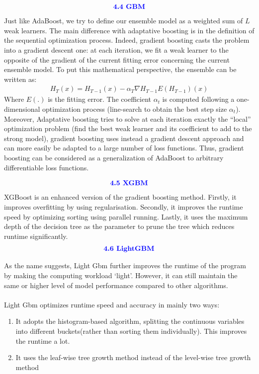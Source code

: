 \documentclass{homework}
\begin{document}
\begin{align*}
    \textcolor{blue}{ \text{{\textbf{4.4 GBM}}}}
 \end{align*}
 Just like AdaBoost, we try to define our ensemble model as a weighted sum of $L$ weak learners. The main difference with adaptative boosting is in the definition of the sequential optimization process. Indeed, gradient boosting casts the problem into a gradient descent one: at each iteration, we fit a weak learner to the opposite of the gradient of the current fitting error concerning the current ensemble model. To put this mathematical perspective, the ensemble can be written as:
 \begin{align*}
    H_T(x) = H_{T-1}(x) - \alpha_T \nabla{H_{T-1}} E(H_{T-1})(x)
 \end{align*}
 Where $E(.)$ is the fitting error. 
 The coefficient $\alpha_t$ is computed following a one-dimensional optimization process (line-search to obtain the best step size $\alpha_t$). Moreover, Adaptative boosting tries to solve at each iteration exactly the “local” optimization problem (find the best weak learner and its coefficient to add to the strong model), gradient boosting uses instead a gradient descent approach and can more easily be adapted to a large number of loss functions. Thus, gradient boosting can be considered as a generalization of AdaBoost to arbitrary differentiable loss functions.

 \begin{align*}
    \textcolor{blue}{ \text{{\textbf{4.5 XGBM}}}}
 \end{align*}
 XGBoost is an enhanced version of the gradient boosting method. Firstly, it improves overfitting by using regularisation. Secondly, it improves the runtime speed by optimizing sorting using parallel running. Lastly, it uses the maximum depth of the decision tree as the parameter to prune the tree which reduces runtime significantly.
 \begin{align*}
    \textcolor{blue}{ \text{{\textbf{4.6 LightGBM}}}}
 \end{align*}

 As the name suggests, Light Gbm further improves the runtime of the program by making the computing workload ‘light’. However, it can still maintain the same or higher level of model performance compared to other algorithms. \\
\\
Light Gbm optimizes runtime speed and accuracy in mainly two ways:
\begin{enumerate}
    \item It adopts the histogram-based algorithm, splitting the continuous variables into different buckets(rather than sorting them individually). This improves the runtime a lot.
    \item It uses the leaf-wise tree growth method instead of the level-wise tree growth method
\end{enumerate}
\end{document}
